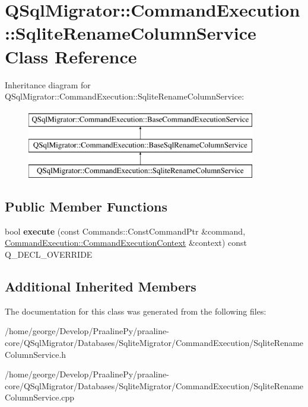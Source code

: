 \hypertarget{class_q_sql_migrator_1_1_command_execution_1_1_sqlite_rename_column_service}{}\section{Q\+Sql\+Migrator\+:\+:Command\+Execution\+:\+:Sqlite\+Rename\+Column\+Service Class Reference}
\label{class_q_sql_migrator_1_1_command_execution_1_1_sqlite_rename_column_service}
Inheritance diagram for Q\+Sql\+Migrator\+:\+:Command\+Execution\+:\+:Sqlite\+Rename\+Column\+Service\+:\begin{figure}[H]
\begin{center}
\leavevmode
\includegraphics[height=3.000000cm]{class_q_sql_migrator_1_1_command_execution_1_1_sqlite_rename_column_service}
\end{center}
\end{figure}
\subsection*{Public Member Functions}
\begin{DoxyCompactItemize}
\item 
\mbox{\label{class_q_sql_migrator_1_1_command_execution_1_1_sqlite_rename_column_service_ad20fa0d5d19ec6ba385b7c05778da90a}} 
bool {\bfseries execute} (const Commands\+::\+Const\+Command\+Ptr \&command, \hyperlink{class_q_sql_migrator_1_1_command_execution_1_1_command_execution_context}{Command\+Execution\+::\+Command\+Execution\+Context} \&context) const Q\+\_\+\+D\+E\+C\+L\+\_\+\+O\+V\+E\+R\+R\+I\+DE
\end{DoxyCompactItemize}
\subsection*{Additional Inherited Members}


The documentation for this class was generated from the following files\+:\begin{DoxyCompactItemize}
\item 
/home/george/\+Develop/\+Praaline\+Py/praaline-\/core/\+Q\+Sql\+Migrator/\+Databases/\+Sqlite\+Migrator/\+Command\+Execution/Sqlite\+Rename\+Column\+Service.\+h\item 
/home/george/\+Develop/\+Praaline\+Py/praaline-\/core/\+Q\+Sql\+Migrator/\+Databases/\+Sqlite\+Migrator/\+Command\+Execution/Sqlite\+Rename\+Column\+Service.\+cpp\end{DoxyCompactItemize}
